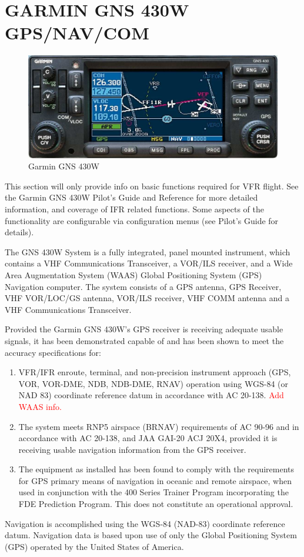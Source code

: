 \section{GARMIN GNS 430W GPS/NAV/COM} 
\begin{figure}
[htb] 
\begin{center}
\includegraphics[scale=0.8]{../Diagrams/gns430_1}
\end{center}
\caption{Garmin GNS 430W} 
\end{figure}

This section will only provide info on basic functions required for VFR flight. See the Garmin GNS 430W Pilot's Guide and Reference for more detailed information, and coverage of IFR related functions. Some aspects of the functionality are configurable via configuration menus (see Pilot's Guide for details).

The GNS 430W System is a fully integrated, panel mounted instrument, which contains a VHF Communications Transceiver, a VOR/ILS receiver, and a Wide Area Augmentation System (WAAS) Global Positioning System (GPS) Navigation computer. The system consists of a GPS antenna, GPS Receiver, VHF VOR/LOC/GS antenna, VOR/ILS receiver, VHF COMM antenna and a VHF Communications Transceiver. 

Provided the Garmin GNS 430W's GPS receiver is receiving adequate usable signals, it has been demonstrated capable of and has been shown to meet the accuracy specifications for:
\begin{enumerate}
\item VFR/IFR enroute, terminal, and non-precision instrument approach (GPS, VOR, VOR-DME, NDB, NDB-DME, RNAV) operation using WGS-84 (or NAD 83) coordinate reference datum in accordance with AC 20-138. \textcolor{red}{Add WAAS info.}
\item The system meets RNP5 airspace (BRNAV) requirements of AC 90-96 and in accordance with AC 20-138, and JAA GAI-20 ACJ 20X4, provided it is receiving usable navigation information from the GPS receiver. 
\item The equipment as installed has been found to comply with the requirements for GPS primary means of navigation in oceanic and remote airspace, when used in conjunction with the 400 Series Trainer Program incorporating the FDE Prediction Program. This does not constitute an operational approval. 
\end{enumerate}
Navigation is accomplished using the WGS-84 (NAD-83) coordinate reference datum. Navigation data is based upon use of only the Global Positioning System (GPS) operated by the United States of America.

